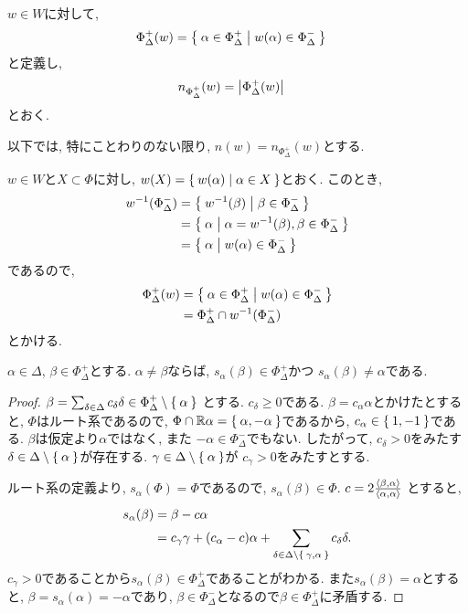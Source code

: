 \begin{definition}
  $w\in W$に対して,
  \begin{align*}
    \Phi_\Delta^{+}(w)
    &=\Set{\alpha\in\Phi_\Delta^+|w(\alpha)\in \Phi_\Delta^-}
  \end{align*}
  と定義し,
  \begin{align*}
    n_{\Phi_\Delta^+}(w)&=\left|\Phi_\Delta^{+}(w)\right|
  \end{align*}
  とおく.
\end{definition}
以下では, 特にことわりのない限り, $n(w)=n_{\Phi_\Delta^+}(w)$とする.
\begin{remark}
  $w\in W$と$X\subset \Phi$に対し,
  $w(X)=\Set{w(\alpha)|\alpha\in X}$とおく.
  このとき, 
  \begin{align*}
    w^{-1}(\Phi_\Delta^-)&=\Set{w^{-1}(\beta)|\beta\in\Phi_\Delta^-}\\
    &=\Set{\alpha|\alpha=w^{-1}(\beta),\beta\in\Phi_\Delta^-}\\
    &=\Set{\alpha|w(\alpha)\in\Phi_\Delta^-}
  \end{align*}
  であるので,
  \begin{align*}
    \Phi_\Delta^{+}(w)
    &=\Set{\alpha\in\Phi_\Delta^+|w(\alpha)\in \Phi_\Delta^-}\\
    &=\Phi_\Delta^+\cap w^{-1}(\Phi_\Delta^{-})
  \end{align*}
  とかける.
\end{remark}
\begin{prop}
  \label{prop:simple:reflect:positive2positive}
  $\alpha\in\Delta$, $\beta\in \Phi_\Delta^+$とする.
  $\alpha\neq\beta$ならば,
  $s_\alpha(\beta)\in \Phi_\Delta^+$かつ
  $s_\alpha(\beta)\neq \alpha$である.
\end{prop}
\begin{proof}
$\beta=\sum_{\delta\in\Delta}c_\delta\delta \in \Phi_\Delta^+\setminus \Set{\alpha}$
とする. $c_\delta\geq 0$である.
$\beta=c_\alpha\alpha$とかけたとすると,
 $\Phi$はルート系であるので,
$\Phi\cap\mathbb{R}\alpha=\Set{\alpha,-\alpha}$であるから,
$c_\alpha\in\Set{1,-1}$である.
$\beta$は仮定より$\alpha$ではなく,
また $-\alpha\in \Phi_\Delta^-$でもない.
したがって,
$c_{\delta}> 0$をみたす
$\delta\in\Delta\setminus\Set{\alpha}$が存在する.
$\gamma\in\Delta\setminus\Set{\alpha}$が
$c_{\gamma}> 0$をみたすとする.

ルート系の定義より,
$s_\alpha(\Phi)=\Phi$であるので,
$s_\alpha(\beta)\in \Phi$.
$c=2\frac{\Braket{\beta,\alpha}}{\Braket{\alpha,\alpha}}$
とすると,
\begin{align*}
  s_\alpha(\beta)&=\beta-c\alpha\\
  &=c_{\gamma}\gamma +(c_\alpha-c)\alpha + \sum_{\delta\in\Delta\setminus\Set{\gamma,\alpha}}c_\delta\delta.
\end{align*}
$c_\gamma>0$であることから$s_\alpha(\beta)\in\Phi_\Delta^+$であることがわかる.
また$s_\alpha(\beta)=\alpha$とすると,
$\beta=s_\alpha(\alpha)=-\alpha$であり,
$\beta\in\Phi_\Delta^-$となるので$\beta\in\Phi_\Delta^+$に矛盾する.
\end{proof}
